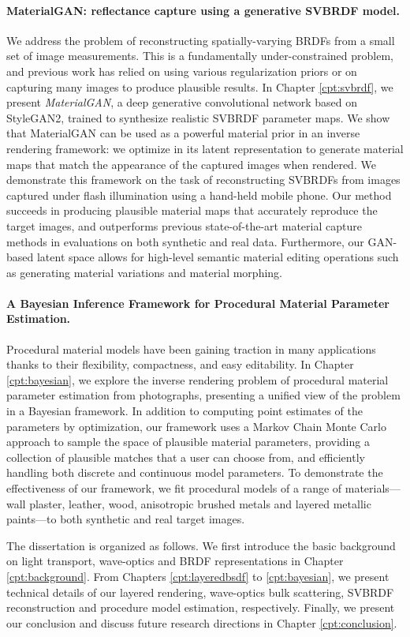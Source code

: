 \paragraph{MaterialGAN: reflectance capture using a generative SVBRDF model.}
We address the problem of reconstructing spatially-varying BRDFs from a small set of image measurements. This is a fundamentally under-constrained problem, and previous work has relied on using various regularization priors or on capturing many images to produce plausible results.
In Chapter \ref{cpt:svbrdf}, we present \emph{MaterialGAN}, a deep generative convolutional network based on StyleGAN2, trained to synthesize realistic SVBRDF parameter maps. We show that MaterialGAN can be used as a powerful material prior in an inverse rendering framework: we optimize in its latent representation to generate material maps that match the appearance of the captured images when rendered. We demonstrate this framework on the task of reconstructing SVBRDFs from images captured under flash illumination using a hand-held mobile phone. Our method succeeds in producing plausible material maps that accurately reproduce the target images, and outperforms previous state-of-the-art material capture methods in evaluations on both synthetic and real data. Furthermore, our GAN-based latent space allows for high-level semantic material editing operations such as generating material variations and material morphing.

\paragraph{A Bayesian Inference Framework for Procedural Material Parameter Estimation.}
Procedural material models have been gaining traction in many applications thanks to their flexibility, compactness, and easy editability.
In Chapter \ref{cpt:bayesian}, we explore the inverse rendering problem of procedural material parameter estimation from photographs, presenting a unified view of the problem in a Bayesian framework. In addition to computing point estimates of the parameters by optimization, our framework uses a Markov Chain Monte Carlo approach to sample the space of plausible material parameters, providing a collection of plausible matches that a user can choose from, and efficiently handling both discrete and continuous model parameters. To demonstrate the effectiveness of our framework, we fit procedural models of a range of materials---wall plaster, leather, wood, anisotropic brushed metals and layered metallic paints---to both synthetic and real target images.

The dissertation is organized as follows. We first introduce the basic background on light transport, wave-optics and BRDF representations in Chapter \ref{cpt:background}. From Chapters \ref{cpt:layeredbsdf} to \ref{cpt:bayesian}, we present technical details of our layered rendering, wave-optics bulk scattering, SVBRDF reconstruction and procedure model estimation, respectively. Finally, we present our conclusion and discuss future research directions in Chapter \ref{cpt:conclusion}.